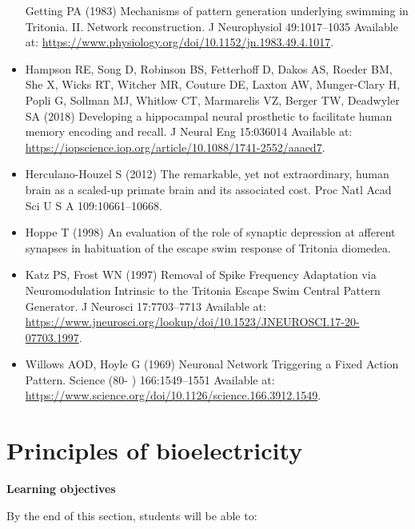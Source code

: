 \documentclass[
]{book}
\begin{document}
\begin{itemize}
  Getting PA (1983) Mechanisms of pattern generation underlying swimming in Tritonia. II. Network reconstruction. J Neurophysiol 49:1017--1035 Available at: \url{https://www.physiology.org/doi/10.1152/jn.1983.49.4.1017}.
\item
  Hampson RE, Song D, Robinson BS, Fetterhoff D, Dakos AS, Roeder BM, She X, Wicks RT, Witcher MR, Couture DE, Laxton AW, Munger-Clary H, Popli G, Sollman MJ, Whitlow CT, Marmarelis VZ, Berger TW, Deadwyler SA (2018) Developing a hippocampal neural prosthetic to facilitate human memory encoding and recall. J Neural Eng 15:036014 Available at: \url{https://iopscience.iop.org/article/10.1088/1741-2552/aaaed7}.
\item
  Herculano-Houzel S (2012) The remarkable, yet not extraordinary, human brain as a scaled-up primate brain and its associated cost. Proc Natl Acad Sci U S A 109:10661--10668.
\item
  Hoppe T (1998) An evaluation of the role of synaptic depression at afferent synapses in habituation of the escape swim response of Tritonia diomedea.
\item
  Katz PS, Frost WN (1997) Removal of Spike Frequency Adaptation via Neuromodulation Intrinsic to the Tritonia Escape Swim Central Pattern Generator. J Neurosci 17:7703--7713 Available at: \url{https://www.jneurosci.org/lookup/doi/10.1523/JNEUROSCI.17-20-07703.1997}.
\item
  Willows AOD, Hoyle G (1969) Neuronal Network Triggering a Fixed Action Pattern. Science (80- ) 166:1549--1551 Available at: \url{https://www.science.org/doi/10.1126/science.166.3912.1549}.
\end{itemize}

\hypertarget{neurophysiology-bioelectricity}{%
\section{Principles of bioelectricity}\label{neurophysiology-bioelectricity}}

\textbf{Learning objectives}

By the end of this section, students will be able to:
\end{document}
